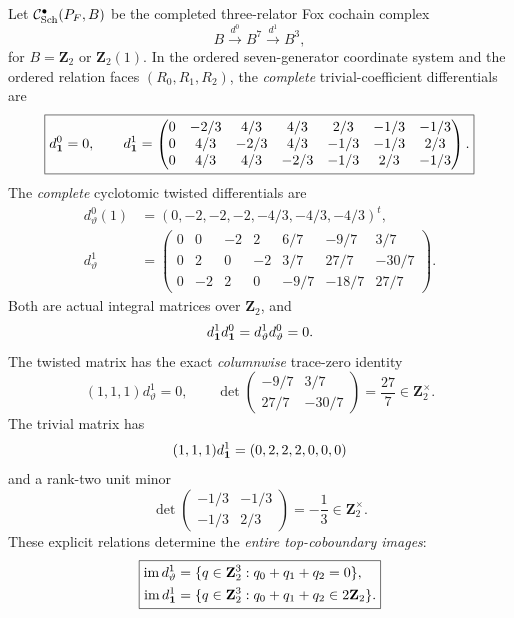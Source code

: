 \begin{theorem}
\label{thm:dyadic-f134-exact-two-fox-matrices}
Let
$\mathcal C_{\rm Sch}^\bullet(P_F,B)$
be the completed
three-relator
Fox cochain complex
\[
B\xrightarrow{d^0}B^7
\xrightarrow{d^1}B^3,
\]
for $B=\mathbf Z_2$
or $\mathbf Z_2(1)$.
In the ordered
seven-generator
coordinate system
and the ordered
relation faces $(R_0,R_1,R_2)$,
the \emph{complete}
trivial-coefficient
differentials are
\begin{equation}\label{eq:dyadic-f134-trivial-fox-matrix}
\boxed{
d_{\bf1}^0=0,\qquad
d_{\bf1}^1=
\begin{pmatrix}
0&-2/3&4/3&4/3&2/3&-1/3&-1/3\\
0&4/3&-2/3&4/3&-1/3&-1/3&2/3\\
0&4/3&4/3&-2/3&-1/3&2/3&-1/3
\end{pmatrix}.
}
\end{equation}
The \emph{complete}
cyclotomic twisted
differentials are
\begin{equation}\label{eq:dyadic-f134-twisted-fox-matrix}
\boxed{
\begin{aligned}
d_\vartheta^0(1)
&=(0,-2,-2,-2,-4/3,-4/3,-4/3)^t,\\
d_\vartheta^1
&=
\begin{pmatrix}
0&0&-2&2&6/7&-9/7&3/7\\
0&2&0&-2&3/7&27/7&-30/7\\
0&-2&2&0&-9/7&-18/7&27/7
\end{pmatrix}.
\end{aligned}}
\end{equation}
Both are actual
integral matrices
over $\mathbf Z_2$,
and
\[
d_{\bf1}^1d_{\bf1}^0
=d_\vartheta^1d_\vartheta^0=0.
\]
The twisted matrix has
the exact \emph{columnwise}
trace-zero identity
\begin{equation}\label{eq:dyadic-f134-cyclotomic-fox-zero-trace}
\boxed{\qquad
(1,1,1)d_\vartheta^1=0,
\qquad
\det\begin{pmatrix}
-9/7&3/7\\
27/7&-30/7
\end{pmatrix}
=\frac{27}{7}\in\mathbf Z_2^\times.
\qquad}
\end{equation}
The trivial matrix has
\[
(1,1,1)d_{\bf1}^1
=(0,2,2,2,0,0,0)
\]
and a rank-two
unit minor
\begin{equation}\label{eq:dyadic-f134-trivial-two-row-unit}
\det\begin{pmatrix}
-1/3&-1/3\\
-1/3&2/3
\end{pmatrix}
=-\frac13\in\mathbf Z_2^\times.
\end{equation}
These explicit
relations determine
the \emph{entire
top-coboundary images}:
\begin{equation}\label{eq:dyadic-f134-images-by-trace}
\boxed{
\begin{aligned}
\operatorname{im}d_\vartheta^1
&=\{q\in\mathbf Z_2^3:
q_0+q_1+q_2=0\},\\
\operatorname{im}d_{\bf1}^1
&=\{q\in\mathbf Z_2^3:
q_0+q_1+q_2\in2\mathbf Z_2\}.
\end{aligned}}
\end{equation}
\end{theorem}


